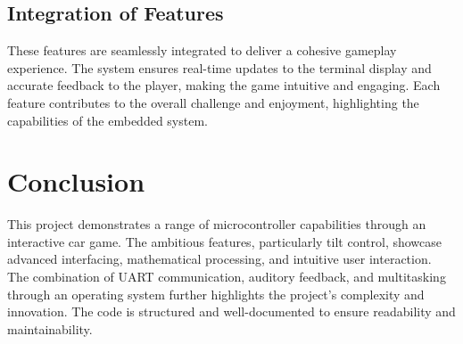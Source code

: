\documentclass[conference]{IEEEtran}
\begin{document}
\subsection{Integration of Features}
These features are seamlessly integrated to deliver a cohesive gameplay experience. The system ensures real-time updates to the terminal display and accurate feedback to the player, making the game intuitive and engaging. Each feature contributes to the overall challenge and enjoyment, highlighting the capabilities of the embedded system.


\section{Conclusion}
This project demonstrates a range of microcontroller capabilities through an interactive car game. The ambitious features, particularly tilt control, showcase advanced interfacing, mathematical processing, and intuitive user interaction. The combination of UART communication, auditory feedback, and multitasking through an operating system further highlights the project’s complexity and innovation. The code is structured and well-documented to ensure readability and maintainability.
\end{document}
